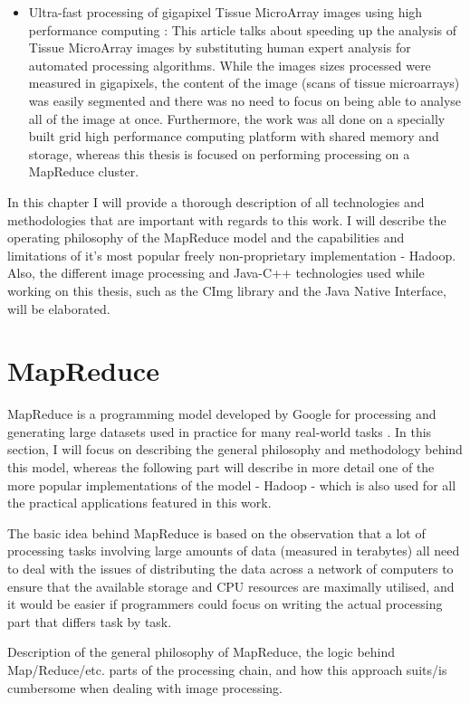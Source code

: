 \documentclass [12pt,a4paper]{report}
\begin{document}
\begin{itemize}
	\item Ultra-fast processing of gigapixel Tissue MicroArray images using high performance computing \cite{wang2011ult}: This article talks about speeding up the analysis of Tissue MicroArray images by substituting human expert analysis for automated processing algorithms. While the images sizes processed were measured in gigapixels, the content of the image (scans of tissue microarrays) was easily segmented and there was no need to focus on being able to analyse all of the image at once. Furthermore, the work was all done on a specially built grid high performance computing platform with shared memory and storage, whereas this thesis is focused on performing processing on a MapReduce cluster.
\end{itemize}

In this chapter I will provide a thorough description of all technologies and methodologies that are important with regards to this work. I will describe the operating philosophy of the MapReduce model and the capabilities and limitations of it's most popular freely non-proprietary implementation - Hadoop. Also, the different image processing and Java-C++ technologies used while working on this thesis, such as the CImg library and the Java Native Interface, will be elaborated.

\section{MapReduce}

MapReduce is a programming model developed by Google for processing and generating large datasets used in practice for many real-world tasks \cite{Dean:2008:MSD:1327452.1327492}. In this section, I will focus on describing the general philosophy and methodology behind this model, whereas the following part will describe in more detail one of the more popular implementations of the model - Hadoop - which is also used for all the practical applications featured in this work.

The basic idea behind MapReduce is based on the observation that a lot of processing tasks involving large amounts of data (measured in terabytes) all need to deal with the issues of distributing the data across a network of computers to ensure that the available storage and CPU resources are maximally utilised, and it would be easier if programmers could focus on writing the actual processing part that differs task by task.
 
Description of the general philosophy of MapReduce, the logic behind Map/Reduce/etc. parts of the processing chain, and how this approach suits/is cumbersome when dealing with image processing.
\end{document}
